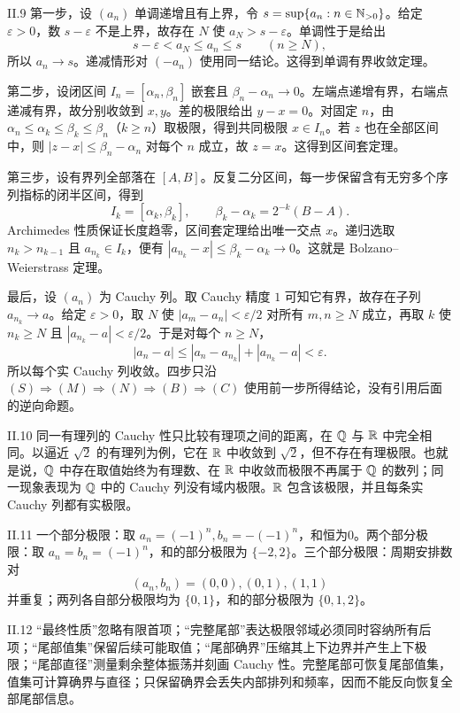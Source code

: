 \begin{solution}{II.9}
第一步，设 \((a_n)\) 单调递增且有上界，令
\(s=\sup\{a_n:n\in\mathbb{N}_{>0}\}\)。给定 \(\varepsilon>0\)，数
\(s-\varepsilon\) 不是上界，故存在 \(N\) 使
\(a_N>s-\varepsilon\)。单调性于是给出
\[
 s-\varepsilon<a_N\le a_n\le s\qquad(n\ge N),
\]
所以 \(a_n\to s\)。递减情形对 \((-a_n)\) 使用同一结论。这得到单调有界收敛定理。

第二步，设闭区间 \(I_n=[\alpha_n,\beta_n]\) 嵌套且
\(\beta_n-\alpha_n\to0\)。左端点递增有界，右端点递减有界，故分别收敛到
\(x,y\)。差的极限给出 \(y-x=0\)。对固定 \(n\)，由
\(\alpha_n\le\alpha_k\le\beta_k\le\beta_n\)（\(k\ge n\)）取极限，得到共同极限 \(x\in I_n\)。若 \(z\) 也在全部区间中，则
\(|z-x|\le\beta_n-\alpha_n\) 对每个 \(n\) 成立，故 \(z=x\)。这得到区间套定理。

第三步，设有界列全部落在 \([A,B]\)。反复二分区间，每一步保留含有无穷多个序列指标的闭半区间，得到
\[
 I_k=[\alpha_k,\beta_k],\qquad
 \beta_k-\alpha_k=2^{-k}(B-A).
\]
Archimedes 性质保证长度趋零，区间套定理给出唯一交点 \(x\)。递归选取
\(n_k>n_{k-1}\) 且 \(a_{n_k}\in I_k\)，便有
\(|a_{n_k}-x|\le\beta_k-\alpha_k\to0\)。这就是 Bolzano--Weierstrass 定理。

最后，设 \((a_n)\) 为 Cauchy 列。取 Cauchy 精度 \(1\) 可知它有界，故存在子列
\(a_{n_k}\to a\)。给定 \(\varepsilon>0\)，取 \(N\) 使
\(|a_m-a_n|<\varepsilon/2\) 对所有 \(m,n\ge N\) 成立，再取
\(k\) 使 \(n_k\ge N\) 且 \(|a_{n_k}-a|<\varepsilon/2\)。于是对每个
\(n\ge N\)，
\[
 |a_n-a|\le |a_n-a_{n_k}|+|a_{n_k}-a|<\varepsilon.
\]
所以每个实 Cauchy 列收敛。四步只沿
\((S)\Rightarrow(M)\Rightarrow(N)\Rightarrow(B)\Rightarrow(C)\)
使用前一步所得结论，没有引用后面的逆向命题。
\end{solution}

\begin{solution}{II.10}
同一有理列的 Cauchy 性只比较有理项之间的距离，在 \(\mathbb{Q}\) 与
\(\mathbb{R}\) 中完全相同。以逼近 \(\sqrt2\) 的有理列为例，它在 \(\mathbb{R}\) 中收敛到
\(\sqrt2\)，但不存在有理极限。也就是说，\(\mathbb{Q}\) 中存在取值始终为有理数、在
\(\mathbb{R}\) 中收敛而极限不再属于 \(\mathbb{Q}\) 的数列；同一现象表现为 \(\mathbb{Q}\) 中的
Cauchy 列没有域内极限。\(\mathbb{R}\) 包含该极限，并且每条实 Cauchy 列都有实极限。
\end{solution}

\begin{solution}{II.11}
一个部分极限：取 \(a_n=(-1)^n,b_n=-(-1)^n\)，和恒为0。两个部分极限：取 \(a_n=b_n=(-1)^n\)，和的部分极限为 \(\{-2,2\}\)。三个部分极限：周期安排数对
\[
 (a_n,b_n)=(0,0),(0,1),(1,1)
\]
并重复；两列各自部分极限均为 \(\{0,1\}\)，和的部分极限为 \(\{0,1,2\}\)。
\end{solution}

\begin{solution}{II.12}
“最终性质”忽略有限首项；“完整尾部”表达极限邻域必须同时容纳所有后项；“尾部值集”保留后续可能取值；“尾部确界”压缩其上下边界并产生上下极限；“尾部直径”测量剩余整体振荡并刻画 Cauchy 性。完整尾部可恢复尾部值集，值集可计算确界与直径；只保留确界会丢失内部排列和频率，因而不能反向恢复全部尾部信息。
\end{solution}
